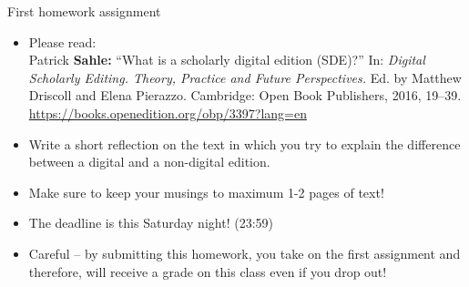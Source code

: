 \begin{frame}{First homework assignment}

\begin{itemize}
    \item Please read: \\ 
    Patrick \textbf{Sahle:} ``What is a scholarly digital edition (SDE)?'' In: \emph{Digital Scholarly Editing. Theory, Practice and Future Perspectives.} Ed. by Matthew Driscoll and Elena Pierazzo. Cambridge: Open Book Publishers, 2016, 19--39.  \protect\url{https://books.openedition.org/obp/3397?lang=en}
    \item Write a short reflection on the text in which you try to explain the difference between a digital and a non-digital edition.
    \item Make sure to keep your musings to maximum 1-2 pages of text! 
    \item The deadline is this Saturday night! (23:59)
    \item Careful -- by submitting this homework, you take on the first assignment and therefore, will receive a grade on this class even if you drop out!
\end{itemize}
    
\end{frame}

